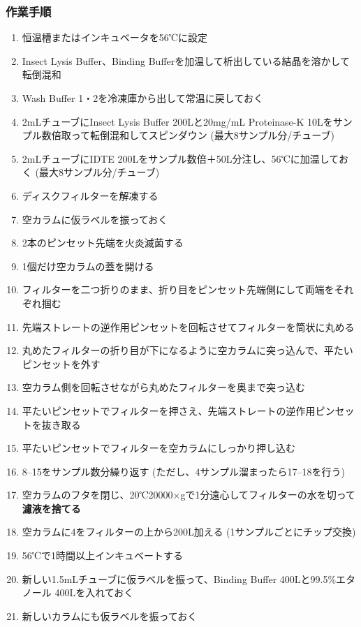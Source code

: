 \documentclass[titlepage,10pt,a4paper,uplatex]{jsbook}
\renewcommand{\textbf}[1]{{\bfseries\sffamily#1}}
\begin{document}
\subsubsection{作業手順}
\begin{enumerate}
\item 恒温槽またはインキュベータを56℃に設定
\item Insect Lysis Buffer、Binding Bufferを加温して析出している結晶を溶かして転倒混和
\item Wash Buffer 1・2を冷凍庫から出して常温に戻しておく
\item 2mLチューブにInsect Lysis Buffer 200{\textmu}Lと20mg/mL Proteinase-K 10{\textmu}Lをサンプル数倍取って転倒混和してスピンダウン (最大8サンプル分/チューブ)
\item 2mLチューブにIDTE 200{\textmu}Lをサンプル数倍＋50{\textmu}L分注し、56℃に加温しておく (最大8サンプル分/チューブ)
\item ディスクフィルターを解凍する
\item 空カラムに仮ラベルを振っておく
\item 2本のピンセット先端を火炎滅菌する
\item 1個だけ空カラムの蓋を開ける
\item フィルターを二つ折りのまま、折り目をピンセット先端側にして両端をそれぞれ掴む
\item 先端ストレートの逆作用ピンセットを回転させてフィルターを筒状に丸める
\item 丸めたフィルターの折り目が下になるように空カラムに突っ込んで、平たいピンセットを外す
\item 空カラム側を回転させながら丸めたフィルターを奥まで突っ込む
\item 平たいピンセットでフィルターを押さえ、先端ストレートの逆作用ピンセットを抜き取る
\item 平たいピンセットでフィルターを空カラムにしっかり押し込む
\item 8--15をサンプル数分繰り返す (ただし、4サンプル溜まったら17--18を行う)
\item 空カラムのフタを閉じ、20℃20000×gで1分遠心してフィルターの水を切って\textbf{濾液を捨てる}
\item 空カラムに4をフィルターの上から200{\textmu}L加える (1サンプルごとにチップ交換)
\item 56℃で1時間以上インキュベートする
\item 新しい1.5mLチューブに仮ラベルを振って、Binding Buffer 400{\textmu}Lと99.5\%エタノール 400{\textmu}Lを入れておく
\item 新しいカラムにも仮ラベルを振っておく

\end{enumerate}
\end{document}
